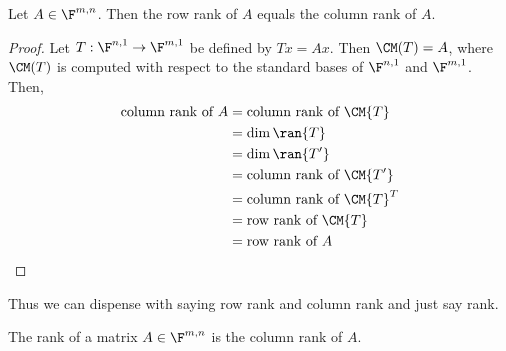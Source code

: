 \documentclass{article}
\begin{document}
  \begin{prop}
    Let $A \in \F^{m, n}$. Then the row rank of $A$ equals the column rank of $A$.
  \end{prop}
  \begin{proof}
    Let $T: \F^{n, 1} \to \F^{m, 1}$ be defined by $Tx = Ax$. Then $\CM(T) = A$, where $\CM(T)$ is computed with respect to the standard bases of $\F^{n, 1}$ and $\F^{m, 1}$. Then,
    \begin{align*}
      \text{column rank of }A & = \text{column rank of }\CM{T} \\
      & = \dim\ran{T} \\
      & = \dim\ran{T^{\prime}} \\
      & = \text{column rank of }\CM{T^{\prime}} \\
      & = \text{column rank of }\CM{T}^T \\
      & = \text{row rank of }\CM{T} \\
      & = \text{row rank of }A \\
    \end{align*}
  \end{proof}
  Thus we can dispense with saying row rank and column rank and just say rank.
  \begin{prop}[rank]
    The rank of a matrix $A \in \F^{m, n}$ is the column rank of $A$.
  \end{prop}
\end{document}
